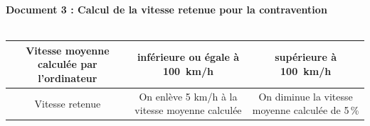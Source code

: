 \begin{exercice}[CRPE 2019 G2]
\begin{center}
\begin{center}
       \end{center}
       \vfill
      {\bf Document 3 : Calcul de la vitesse retenue pour la contravention} \\ [1mm]
       \\ [5mm]
      \begin{tabular}{|C{4}|C{4}|C{4}|}
         \hline
         Vitesse moyenne calculée par l'ordinateur & inférieure ou égale à 100~km/h & supérieure à 100~km/h \\
         \hline
         Vitesse retenue & On enlève 5 km/h à la vitesse moyenne calculée & On diminue la vitesse moyenne calculée de 5\,\% \\
         \hline 
      \end{tabular}
   \end{center}
\end{exercice}

